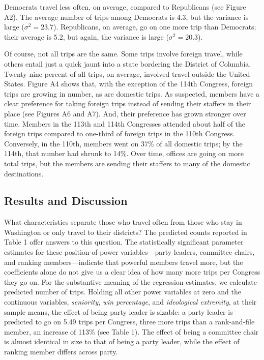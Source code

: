 \documentclass[12pt]{article}                           %
\begin{document}
Democrats travel less often, on average, compared to Republicans (see Figure A2). The average number of trips among Democrats is 4.3, but the variance is large ($\sigma^2 = 23.7$). Republicans, on average, go on one more trip than Democrats; their average is 5.2, but again, the variance is large ($\sigma^2 = 20.3$).

Of course, not all trips are the same. Some trips involve foreign travel, while others entail just a quick jaunt into a state bordering the District of Columbia. Twenty-nine percent of all trips, on average, involved travel outside the United States. Figure A4 shows that, with the exception of the 114th Congress, foreign trips are growing in number, as are domestic trips. As suspected, members have a clear preference for taking foreign trips instead of sending their staffers in their place (see Figures A6 and A7). And, their preference has grown stronger over time. Members in the 113th and 114th Congresses attended about half of the foreign trips compared to one-third of foreign trips in the 110th Congress. Conversely, in the 110th, members went on 37\% of all domestic trips; by the 114th, that number had shrunk to 14\%. Over time, offices are going on more total trips, but the members are sending their staffers to many of the domestic destinations.

\subsection*{Results and Discussion}

What characteristics separate those who travel often from those who stay in Washington or only travel to their districts? The predicted counts reported in Table 1 offer answers to this question. The statistically significant parameter estimates for these position-of-power variables---party leaders, committee chairs, and ranking members---indicate that powerful members travel more, but the coefficients alone do not give us a clear idea of how many more trips per Congress they go on. For the substantive meaning of the regression estimates, we calculate predicted number of trips. Holding all other power variables at zero and the continuous variables, \emph{seniority}, \emph{win percentage}, and \emph{ideological extremity}, at their sample means, the effect of being party leader is sizable: a party leader is predicted to go on 5.49 trips per Congress, three more trips than a rank-and-file member, an increase of 113\% (see Table 1). The effect of being a committee chair is almost identical in size to that of being a party leader, while the effect of ranking member differs across party.
\end{document}
